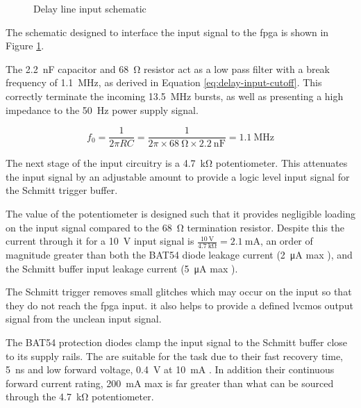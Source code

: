\begin{figure}[ht]
	\centering
	\caption{Delay line input schematic }
	\label{fig:delay-line-input-sch}
\end{figure}

The schematic designed to interface the input signal to the \gls{fpga} is shown in Figure \ref{fig:delay-line-input-sch}.

The \SI{2.2}{\nano\farad} capacitor and \SI{68}{\ohm} resistor act as a low pass filter with a break frequency of \SI{1.1}{\mega\hertz}, as derived in Equation \ref{eq:delay-input-cutoff}. This correctly terminate the incoming \SI{13.5}{\mega\hertz} bursts, as well as presenting a high impedance to the \SI{50}{\hertz} power supply signal.

\begin{equation}
f_0 = \frac{1}{2\pi RC} = \frac{1}{2\pi \times \SI{68}{\ohm} \times \SI{2.2}{\nano\farad}} = \SI{1.1}{\mega\hertz} \label{eq:delay-input-cutoff}
\end{equation}

The next stage of the input circuitry is a \SI{4.7}{\kilo\ohm} potentiometer. This attenuates the input signal by an adjustable amount to provide a logic level input signal for the Schmitt trigger buffer.

The value of the potentiometer is designed such that it provides negligible loading on the input signal compared to the \SI{68}{\ohm} termination resistor. Despite this the current through it for a \SI{10}{\volt} input signal is $\frac{\SI{10}{\volt}}{\SI{4.7}{\kilo\ohm}} = \SI{2.1}{\milli\ampere}$, an order of magnitude greater than both the BAT54 diode leakage current (\SI{2}{\micro\ampere} max \cite[p.2]{vishay2013}), and the Schmitt buffer input leakage current (\SI{5}{\micro\ampere} max \cite[p.4]{diodesinc2014}).

The Schmitt trigger removes small glitches which may occur on the input so that they do not reach the \gls{fpga} input. it also helps to provide a defined \gls{lvcmos} output signal from the unclean input signal.

The BAT54 protection diodes clamp the input signal to the Schmitt buffer close to its supply rails. The are suitable for the task due to their fast recovery time, \SI{5}{\nano\second} and low forward voltage, \SI{0.4}{\volt} at \SI{10}{\milli\ampere} \cite[p.2]{vishay2013}. In addition their continuous forward current rating, \SI{200}{\milli\ampere} max is far greater than what can be sourced through the \SI{4.7}{\kilo\ohm} potentiometer.

